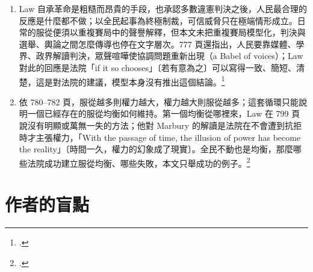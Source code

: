 \begin{enumerate}
\item
  Law 自承革命是粗糙而昂貴的手段，也承認多數違憲判決之後，人民最合理的反應是什麼都不做；以全民起事為終極制裁，可信威脅只在極端情形成立。日常的服從便須以重複賽局中的聲譽解釋，但本文未把重複賽局模型化，判決與選舉、輿論之間怎麼傳導也停在文字層次。777 頁還指出，人民要靠媒體、學界、政界解讀判決，眾聲喧嘩使協調問題重新出現（a Babel of voices）；Law 對此的回應是法院「if it so chooses」〔若有意為之〕可以寫得一致、簡短、清楚，這是對法院的建議，模型本身沒有推出這個結論。\footcite[769, 777--778, 781]{law2009}
\item
  依 780--782 頁，服從越多則權力越大，權力越大則服從越多；這套循環只能說明一個已經存在的服從均衡如何維持。第一個均衡從哪裡來，Law 在 799 頁說沒有明顯或萬無一失的方法；他對 Marbury 的解讀是法院在不會遭到抗拒時才主張權力，「With the passage of time, the illusion of power has become the reality」〔時間一久，權力的幻象成了現實〕。全民不動也是均衡，那麼哪些法院成功建立服從均衡、哪些失敗，本文只舉成功的例子。\footcite[742, 780--785, 799]{law2009}
\end{enumerate}

\section{作者的盲點}
\label{sec:20_game-4}

